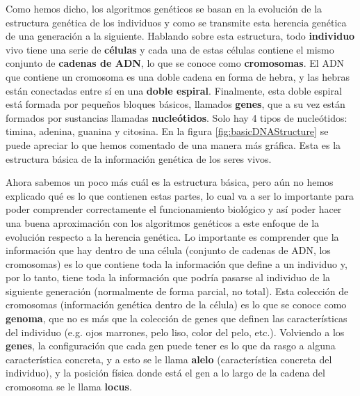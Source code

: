 Como hemos dicho, los algoritmos genéticos se basan en la evolución de la estructura genética de los individuos y como se transmite esta herencia genética de una generación a la siguiente. Hablando sobre esta estructura, todo \textbf{individuo} vivo tiene una serie de \textbf{células} y cada una de estas células contiene el mismo conjunto de \textbf{cadenas de ADN}, lo que se conoce como \textbf{cromosomas}. El ADN que contiene un cromosoma es una doble cadena en forma de hebra, y las hebras están conectadas entre sí en una \textbf{doble espiral}. Finalmente, esta doble espiral está formada por pequeños bloques básicos, llamados \textbf{genes}, que a su vez están formados por sustancias llamadas \textbf{nucleótidos}. Solo hay 4 tipos de nucleótidos: timina, adenina, guanina y citosina. En la figura \ref{fig:basicDNAStructure} se puede apreciar lo que hemos comentado de una manera más gráfica. Esta es la estructura básica de la información genética de los seres vivos.

Ahora sabemos un poco más cuál es la estructura básica, pero aún no hemos explicado qué es lo que contienen estas partes, lo cual va a ser lo importante para poder comprender correctamente el funcionamiento biológico y así poder hacer una buena aproximación con los algoritmos genéticos a este enfoque de la evolución respecto a la herencia genética. Lo importante es comprender que la información que hay dentro de una célula (conjunto de cadenas de ADN, los cromosomas) es lo que contiene toda la información que define a un individuo y, por lo tanto, tiene toda la información que podría pasarse al individuo de la siguiente generación (normalmente de forma parcial, no total). Esta colección de cromosomas (información genética dentro de la célula) es lo que se conoce como \textbf{genoma}, que no es más que la colección de genes que definen las características del individuo (e.g. ojos marrones, pelo liso, color del pelo, etc.). Volviendo a los \textbf{genes}, la configuración que cada gen puede tener es lo que da rasgo a alguna característica concreta, y a esto se le llama \textbf{alelo} (característica concreta del individuo), y la posición física donde está el gen a lo largo de la cadena del cromosoma se le llama \textbf{locus}.

